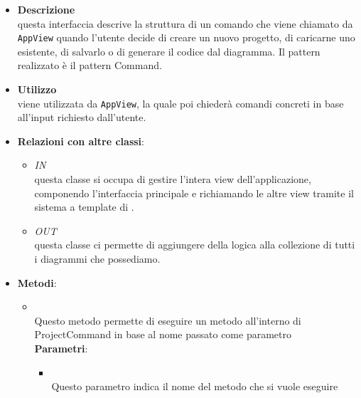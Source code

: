 \label{\nogloxy{swedesigner::client::model::ProjectCommand}}
\begin{figure}[h]
\centering
{}
\caption{}
\end{figure}
\FloatBarrier
\begin{itemize}
\item \textbf{Descrizione}\\
questa interfaccia descrive la struttura di un comando che viene chiamato da \texttt{AppView} quando l'utente decide di creare un nuovo progetto, di caricarne uno esistente, di salvarlo o di generare il codice dal diagramma. Il pattern realizzato è il pattern Command.
\item \textbf{Utilizzo}\\
viene utilizzata da \texttt{AppView}, la quale poi chiederà comandi concreti in base all'input richiesto dall'utente.
\item \textbf{Relazioni con altre classi}:
\begin{itemize}
\item \textit{IN} \hyperref[\nogloxy{swedesigner::client::view::AppView}]{}\\
questa classe si occupa di gestire l'intera view dell'applicazione, componendo l'interfaccia principale e richiamando le altre view tramite il sistema a template di \backbonejs{}.
\item \textit{OUT} \hyperref[\nogloxy{swedesigner::client::model::ProjectModel}]{}\\
questa classe ci permette di aggiungere della logica alla collezione di tutti i diagrammi che possediamo.
\end{itemize}
\item \textbf{Metodi}:
\begin{itemize}
\item {}
\\ Questo metodo permette di eseguire un metodo all'interno di ProjectCommand in base al nome passato come parametro
\\ \textbf{Parametri}:
\begin{itemize}
\item {}
\\ Questo parametro indica il nome del metodo che si vuole eseguire

\end{itemize}
\end{itemize}
\end{itemize}
